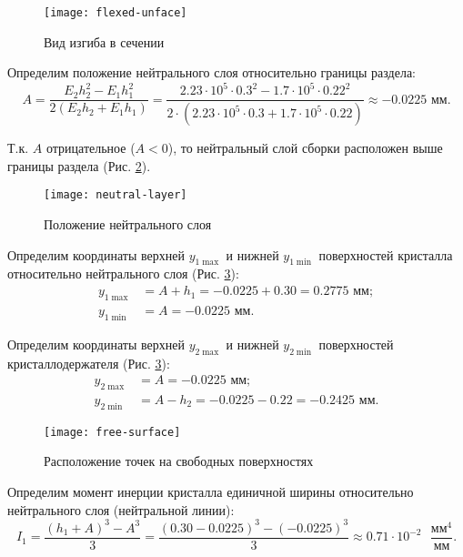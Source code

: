 \begin{figure}[h]
    \centering
    \texttt{[image: flexed-unface]}
    \caption{Вид изгиба в сечении}
    \label{fig:flexed-unface}
\end{figure}

Определим положение нейтрального слоя относительно границы раздела:
\[
    A = \frac{E_2 h_2^2 - E_1 h_1^2}{2 \left(E_2 h_2 + E_1 h_1\right)}
      = \frac{2.23 \cdot 10^5 \cdot 0.3^2 - 1.7 \cdot 10^5 \cdot 0.22^2}{2 \cdot (2.23 \cdot 10^5 \cdot 0.3 + 1.7 \cdot 10^5 \cdot 0.22)}
      \approx -0.0225 \text{ мм}.
\]

Т.к. $A$ отрицательное ($A < 0$), то нейтральный слой сборки расположен выше границы раздела (Рис. \ref{fig:neutral-layer}).

\begin{figure}[h]
    \centering
    \texttt{[image: neutral-layer]}
    \caption{Положение нейтрального слоя}
    \label{fig:neutral-layer}
\end{figure}

Определим координаты верхней $y_{1\max}$ и нижней $y_{1\min}$ поверхностей кристалла относительно нейтрального слоя (Рис. \ref{fig:free-surface}):
\begin{equation}
    \begin{aligned}
        y_{1\max} & = A + h_1 = -0.0225 + 0.30 = 0.2775 \text{ мм}; \\
        y_{1\min} & = A = -0.0225 \text{ мм}.
    \end{aligned}
\end{equation}

Определим координаты верхней $y_{2\max}$ и нижней $y_{2\min}$ поверхностей кристаллодержателя (Рис. \ref{fig:free-surface}):
\begin{equation}
    \begin{aligned}
        y_{2\max} & = A = -0.0225 \text{ мм}; \\
        y_{2\min} & = A - h_2 = -0.0225 - 0.22 = -0.2425 \text{ мм}.
    \end{aligned}
\end{equation}

\begin{figure}[h]
    \centering
    \texttt{[image: free-surface]}
    \caption{Расположение точек на свободных поверхностях}
    \label{fig:free-surface}
\end{figure}

Определим момент инерции кристалла единичной ширины относительно нейтрального слоя (нейтральной линии):
\[
    I_1 = \frac{(h_1 + A)^3 - A^3}{3}
        = \frac{(0.30 - 0.0225)^3 - (-0.0225)^3}{3}
        \approx 0.71 \cdot 10^{-2} \text{ } \frac{мм^4}{мм}.
\]

